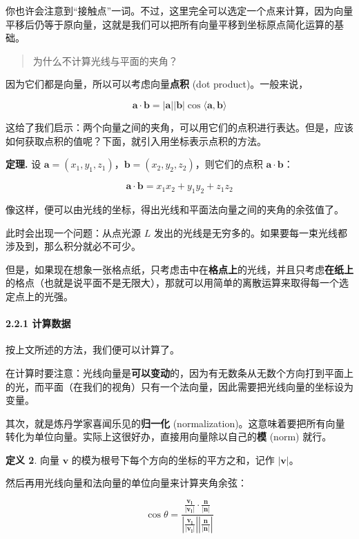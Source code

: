 \documentclass[
]{article}
\begin{document}
你也许会注意到``接触点''一词。不过，这里完全可以选定一个点来计算，因为向量平移后仍等于原向量，这就是我们可以把所有向量平移到坐标原点简化运算的基础。

\begin{quote}
为什么不计算光线与平面的夹角？
\end{quote}

因为它们都是向量，所以可以考虑向量\textbf{点积} (dot
product)。一般来说，

\[\mathbf{a}\cdot\mathbf{b}=|\mathbf{a}||\mathbf{b}|\cos\langle\mathbf{a}, \mathbf{b}\rangle\]

这给了我们启示：两个向量之间的夹角，可以用它们的点积进行表达。但是，应该如何获取点积的值呢？下面，就引入用坐标表示点积的方法。

\textbf{定理.} 设
\(\mathbf{a}=(x_1, y_1, z_1)\)，\(\mathbf{b}=(x_2, y_2, z_2)\)，则它们的点积
\(\mathbf{a}\cdot\mathbf{b}\)：

\[\mathbf{a}\cdot\mathbf{b}=x_1x_2+y_1y_2+z_1z_2\]

像这样，便可以由光线的坐标，得出光线和平面法向量之间的夹角的余弦值了。

此时会出现一个问题：从点光源 \(L\)
发出的光线是无穷多的。如果要每一束光线都涉及到，那么积分就必不可少。

但是，如果现在想象一张格点纸，只考虑击中在\textbf{格点上}的光线，并且只考虑\textbf{在纸上}的格点（也就是说平面不是无限大），那就可以用简单的离散运算来取得每一个选定点上的光强。

\hypertarget{221-ux8ba1ux7b97ux6570ux636e}{%
\paragraph{2.2.1 计算数据}\label{221-ux8ba1ux7b97ux6570ux636e}}

按上文所述的方法，我们便可以计算了。

在计算时要注意：光线向量是\textbf{可以变动}的，因为有无数条从无数个方向打到平面上的光，而平面（在我们的视角）只有一个法向量，因此需要把光线向量的坐标设为变量。

其次，就是炼丹学家喜闻乐见的\textbf{归一化}
(normalization)。这意味着要把所有向量转化为单位向量。实际上这很好办，直接用向量除以自己的\textbf{模}
(norm) 就行。

\textbf{定义 2}. 向量 \(\mathbf{v}\)
的模为根号下每个方向的坐标的平方之和，记作 \(|\mathbf{v}|\)。

然后再用光线向量和法向量的单位向量来计算夹角余弦：

\[\cos \theta = \frac{\frac{\mathbf{v_l}}{|\mathbf{v_l}|}\cdot\frac{\mathbf{n}}{|\mathbf{n}|}}{|\frac{\mathbf{v_l}}{|\mathbf{v_l}|}||\frac{\mathbf{n}}{|\mathbf{n}|}|}\]
\end{document}
